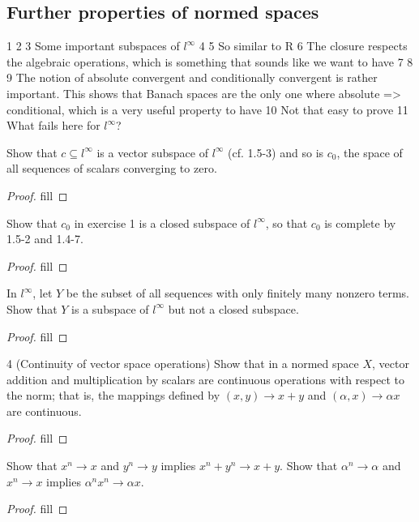 \subsection{Further properties of normed spaces}

1
2 
3 Some important subspaces of $l^\infty$
4
5 So similar to R
6 The closure respects the algebraic operations, which is something that sounds like we want to have
7
8
9 The notion of absolute convergent and conditionally convergent is rather important. This shows that Banach spaces are the only one where absolute => conditional, which is a very useful property to have
10 Not that easy to prove
11 What fails here for $l^\infty$?

\begin{exercise}{1}
Show that $c\subseteq l^\infty$ is a vector subspace of $l^\infty$ (cf. 1.5-3) and so is $c_0$, the space of all sequences of scalars converging to zero.
\end{exercise}
\begin{proof}
fill
\end{proof}

\begin{exercise}{2}
Show that $c_0$ in exercise 1 is a closed subspace of $l^\infty$, so that $c_0$ is complete by 1.5-2 and 1.4-7.
\end{exercise}
\begin{proof}
fill
\end{proof}

\begin{exercise}{3}
In $l^\infty$, let $Y$ be the subset of all sequences with only finitely many nonzero terms. Show that $Y$ is a subspace of $l^\infty$ but not a closed subspace.
\end{exercise}
\begin{proof}
fill
\end{proof}

\begin{exercise}{4 (Continuity of vector space operations)}
Show that in a normed space $X$, vector addition and multiplication by scalars are continuous operations with respect to the norm; that is, the mappings defined by $(x,y)\to x+y$ and $(\alpha, x)\to \alpha x$ are continuous.
\end{exercise}
\begin{proof}
fill
\end{proof}

\begin{exercise}{5}
Show that $x^n\to x$ and $y^n\to y$ implies $x^n+y^n\to x+y$. Show that $\alpha^n\to\alpha$ and $x^n\to x$ implies $\alpha^nx^n\to \alpha x$.
\end{exercise}
\begin{proof}
fill
\end{proof}

